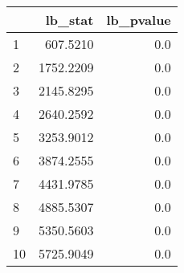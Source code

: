 \begin{tabular}{lrr}
\toprule
{} &    lb\_stat &  lb\_pvalue \\
\midrule
1  &   607.5210 &        0.0 \\
2  &  1752.2209 &        0.0 \\
3  &  2145.8295 &        0.0 \\
4  &  2640.2592 &        0.0 \\
5  &  3253.9012 &        0.0 \\
6  &  3874.2555 &        0.0 \\
7  &  4431.9785 &        0.0 \\
8  &  4885.5307 &        0.0 \\
9  &  5350.5603 &        0.0 \\
10 &  5725.9049 &        0.0 \\
\bottomrule
\end{tabular}
